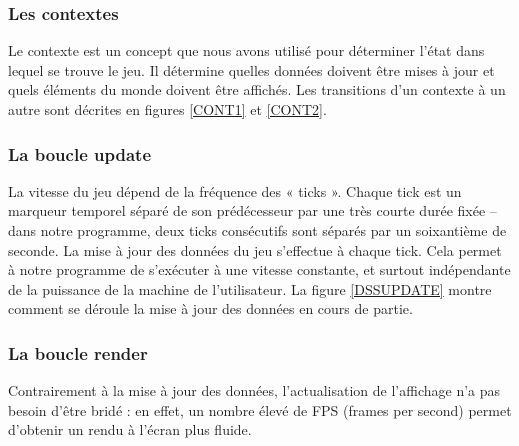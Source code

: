 \subsubsection{Les contextes}

Le contexte est un concept que nous avons utilisé pour déterminer l'état dans lequel se trouve le jeu. Il détermine quelles données doivent être mises à jour et quels éléments du monde doivent être affichés.
\ml
Les transitions d'un contexte à un autre sont décrites en figures \ref{CONT1} et \ref{CONT2}.


\subsubsection{La boucle update}

La vitesse du jeu dépend de la fréquence des « ticks ». Chaque tick est un marqueur temporel séparé de son prédécesseur par une très courte durée fixée – dans notre programme, deux ticks consécutifs sont séparés par un soixantième de seconde.
\ml\ml
La mise à jour des données du jeu s'effectue à chaque tick. Cela permet à notre programme de s'exécuter à une vitesse constante, et surtout indépendante de la puissance de la machine de l'utilisateur.
\ml\ml
La figure \ref{DSSUPDATE} montre comment se déroule la mise à jour des données en cours de partie.


\subsubsection{La boucle render}

Contrairement à la mise à jour des données, l'actualisation de l'affichage n'a pas besoin d'être bridé : en effet, un nombre élevé de FPS (frames per second) permet d'obtenir un rendu à l'écran plus fluide.